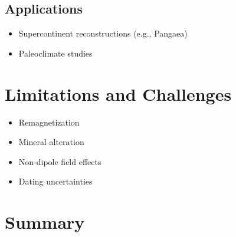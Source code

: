 \subsection{Applications}
\begin{itemize}
\item Supercontinent reconstructions (e.g., Pangaea)
\item Paleoclimate studies
\end{itemize}

\section{Limitations and Challenges}

\begin{itemize}
\item Remagnetization
\item Mineral alteration
\item Non-dipole field effects
\item Dating uncertainties
\end{itemize}

\section{Summary}



